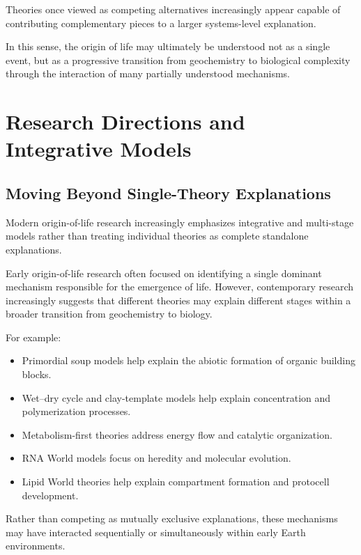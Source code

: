 \documentclass[
  oneside]{book}
\providecommand{\tightlist}{%
  \setlength{\itemsep}{0pt}\setlength{\parskip}{0pt}}
\begin{document}
Theories once viewed as competing alternatives increasingly appear capable of contributing complementary pieces to a larger systems-level explanation.

In this sense, the origin of life may ultimately be understood not as a single event, but as a progressive transition from geochemistry to biological complexity through the interaction of many partially understood mechanisms.

\chapter{Research Directions and Integrative Models}\label{research-directions-and-integrative-models}

\section{Moving Beyond Single-Theory Explanations}\label{moving-beyond-single-theory-explanations}

Modern origin-of-life research increasingly emphasizes integrative and multi-stage models rather than treating individual theories as complete standalone explanations.

Early origin-of-life research often focused on identifying a single dominant mechanism responsible for the emergence of life. However, contemporary research increasingly suggests that different theories may explain different stages within a broader transition from geochemistry to biology.

For example:

\begin{itemize}
\tightlist
\item
  Primordial soup models help explain the abiotic formation of organic building blocks.
\item
  Wet--dry cycle and clay-template models help explain concentration and polymerization processes.
\item
  Metabolism-first theories address energy flow and catalytic organization.
\item
  RNA World models focus on heredity and molecular evolution.
\item
  Lipid World theories help explain compartment formation and protocell development.
\end{itemize}

Rather than competing as mutually exclusive explanations, these mechanisms may have interacted sequentially or simultaneously within early Earth environments.
\end{document}
